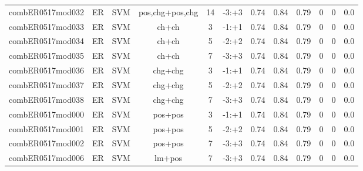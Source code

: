 \documentclass[a4paper]{article}
\begin{document}
\begin{landscape}
\begin{center}
\begin{tabular}{ |c|c|c|c|c|c|c|c|c|c|c|c|}
 
 	
 	\small{ combER0517mod032 } & ER & SVM & pos,chg+pos,chg  &  14 &  -3:+3  &  0.74 & 0.84 & 0.79  &  0 & 0 & 0.0 \\
 	

 
 	
 	\small{ combER0517mod033 } & ER & SVM & ch+ch  &  3 &  -1:+1  &  0.74 & 0.84 & 0.79  &  0 & 0 & 0.0 \\
 	

 
 	
 	\small{ combER0517mod034 } & ER & SVM & ch+ch  &  5 &  -2:+2  &  0.74 & 0.84 & 0.79  &  0 & 0 & 0.0 \\
 	

 
 	
 	\small{ combER0517mod035 } & ER & SVM & ch+ch  &  7 &  -3:+3  &  0.74 & 0.84 & 0.79  &  0 & 0 & 0.0 \\
 	

 
 	
 	\small{ combER0517mod036 } & ER & SVM & chg+chg  &  3 &  -1:+1  &  0.74 & 0.84 & 0.79  &  0 & 0 & 0.0 \\
 	

 
 	
 	\small{ combER0517mod037 } & ER & SVM & chg+chg  &  5 &  -2:+2  &  0.74 & 0.84 & 0.79  &  0 & 0 & 0.0 \\
 	

 
 	
 	\small{ combER0517mod038 } & ER & SVM & chg+chg  &  7 &  -3:+3  &  0.74 & 0.84 & 0.79  &  0 & 0 & 0.0 \\
 	

 
 	
 	\small{ combER0517mod000 } & ER & SVM & pos+pos  &  3 &  -1:+1  &  0.74 & 0.84 & 0.79  &  0 & 0 & 0.0 \\
 	

 
 	
 	\small{ combER0517mod001 } & ER & SVM & pos+pos  &  5 &  -2:+2  &  0.74 & 0.84 & 0.79  &  0 & 0 & 0.0 \\
 	

 
 	
 	\small{ combER0517mod002 } & ER & SVM & pos+pos  &  7 &  -3:+3  &  0.74 & 0.84 & 0.79  &  0 & 0 & 0.0 \\
 	

 
 	
 	\small{ combER0517mod006 } & ER & SVM & lm+pos  &  7 &  -3:+3  &  0.74 & 0.84 & 0.79  &  0 & 0 & 0.0 \\
 	

 
 	

\end{tabular}
\end{center}
\end{landscape}
\end{document}

